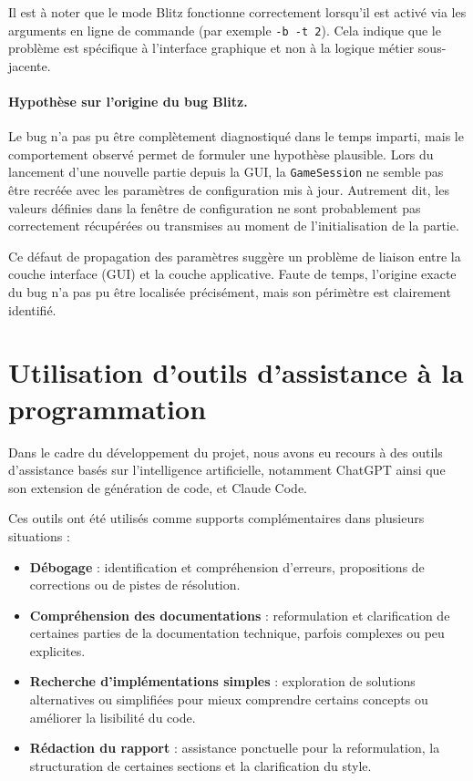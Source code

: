 \documentclass[a4paper]{article}
\begin{document}
Il est à noter que le mode Blitz fonctionne correctement lorsqu’il est activé
via les arguments en ligne de commande (par exemple \texttt{-b -t 2}). Cela
indique que le problème est spécifique à l’interface graphique et non à la
logique métier sous-jacente.

\paragraph{Hypothèse sur l’origine du bug Blitz.}
Le bug n’a pas pu être complètement diagnostiqué dans le temps imparti, mais le
comportement observé permet de formuler une hypothèse plausible. Lors du
lancement d’une nouvelle partie depuis la GUI, la \texttt{GameSession} ne
semble pas être recréée avec les paramètres de configuration mis à jour.
Autrement dit, les valeurs définies dans la fenêtre de configuration ne sont
probablement pas correctement récupérées ou transmises au moment de
l’initialisation de la partie.

Ce défaut de propagation des paramètres suggère un problème de liaison entre la
couche interface (GUI) et la couche applicative. Faute de temps, l’origine
exacte du bug n’a pas pu être localisée précisément, mais son périmètre est
clairement identifié.

\section*{Utilisation d'outils d'assistance à la programmation}

Dans le cadre du développement du projet, nous avons eu recours à des outils
d'assistance basés sur l'intelligence artificielle, notamment ChatGPT ainsi que
son extension de génération de code, et Claude Code.

Ces outils ont été utilisés comme supports complémentaires dans plusieurs
situations :

\begin{itemize}
  \item \textbf{Débogage} : identification et compréhension d'erreurs,
        propositions de corrections ou de pistes de résolution.
  \item \textbf{Compréhension des documentations} : reformulation et
        clarification de certaines parties de la documentation technique, parfois
        complexes ou peu explicites.
  \item \textbf{Recherche d'implémentations simples} : exploration de solutions
        alternatives ou simplifiées pour mieux comprendre certains concepts ou
        améliorer la lisibilité du code.
  \item \textbf{Rédaction du rapport} : assistance ponctuelle pour la reformulation,
        la structuration de certaines sections et la clarification du style.
\end{itemize}
\end{document}
